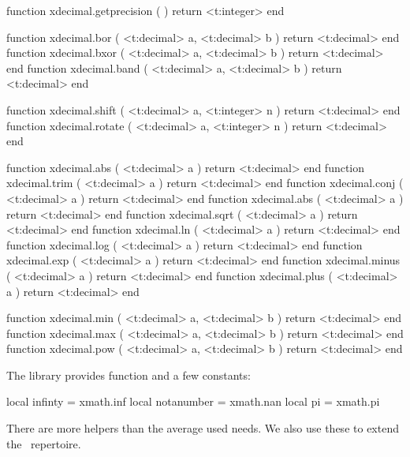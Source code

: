 function xdecimal.getprecision ( )
    return <t:integer>
end
\stoptyping

\starttyping[option=LUA]
function xdecimal.bor  ( <t:decimal> a, <t:decimal> b ) return <t:decimal> end
function xdecimal.bxor ( <t:decimal> a, <t:decimal> b ) return <t:decimal> end
function xdecimal.band ( <t:decimal> a, <t:decimal> b ) return <t:decimal> end
\stoptyping

\starttyping[option=LUA]
function xdecimal.shift  ( <t:decimal> a, <t:integer> n ) return <t:decimal> end
function xdecimal.rotate ( <t:decimal> a, <t:integer> n ) return <t:decimal> end
\stoptyping

\starttyping[option=LUA]
function xdecimal.abs   ( <t:decimal> a ) return <t:decimal> end
function xdecimal.trim  ( <t:decimal> a ) return <t:decimal> end
function xdecimal.conj  ( <t:decimal> a ) return <t:decimal> end
function xdecimal.abs   ( <t:decimal> a ) return <t:decimal> end
function xdecimal.sqrt  ( <t:decimal> a ) return <t:decimal> end
function xdecimal.ln    ( <t:decimal> a ) return <t:decimal> end
function xdecimal.log   ( <t:decimal> a ) return <t:decimal> end
function xdecimal.exp   ( <t:decimal> a ) return <t:decimal> end
function xdecimal.minus ( <t:decimal> a ) return <t:decimal> end
function xdecimal.plus  ( <t:decimal> a ) return <t:decimal> end

function xdecimal.min ( <t:decimal> a, <t:decimal> b ) return <t:decimal> end
function xdecimal.max ( <t:decimal> a, <t:decimal> b ) return <t:decimal> end
function xdecimal.pow ( <t:decimal> a, <t:decimal> b ) return <t:decimal> end
\stoptyping

\stopsubsection

\startsubsection[title=Math helpers]

The  library provides function and a few constants:

\starttyping[option=LUA]
local infinty    = xmath.inf
local notanumber = xmath.nan
local pi         = xmath.pi
\stoptyping

There are more helpers than the average used needs. We also use these
to extend the \METAPOST\ repertoire.

